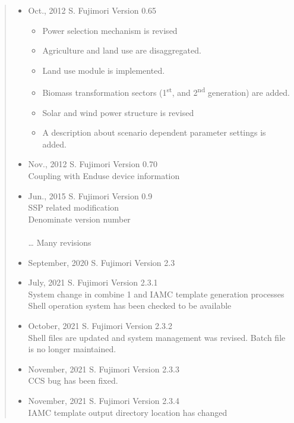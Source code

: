 \documentclass[10pt,a4paper,titlepage,dvipdfmx]{book}
\begin{document}
\begin{quote}
\begin{itemize}
  \item Oct., 2012 S. Fujimori Version 0.65
    \begin{itemize}
      \item Power selection mechanism is revised
      \item Agriculture and land use are disaggregated.
      \item Land use module is implemented.
      \item Biomass transformation sectors (1\textsuperscript{st}, and 2\textsuperscript{nd} generation) are added.
      \item Solar and wind power structure is revised
      \item A description about scenario dependent parameter settings is added. 
    \end{itemize}

  \item Nov., 2012 S. Fujimori Version 0.70 \mbox{}\\
      Coupling with Enduse device information

  \item Jun., 2015 S. Fujimori Version 0.9 \mbox{}\\
      SSP related modification\\
      Denominate version number\\
\\
{\ldots} Many revisions
\\
  \item September, 2020 S. Fujimori Version 2.3 \mbox{}\\

  \item July, 2021 S. Fujimori Version 2.3.1 \mbox{}\\
      System change in combine 1 and IAMC template generation processes
      Shell operation system has been checked to be available
      

  \item October, 2021 S. Fujimori Version 2.3.2 \mbox{}\\
     Shell files are updated and system management was revised. 
     Batch file is no longer maintained.


  \item November, 2021 S. Fujimori Version 2.3.3 \\
     CCS bug has been fixed.


  \item November, 2021 S. Fujimori Version 2.3.4 \\
     IAMC template output directory location has changed



\end{itemize}
\end{quote}
\end{document}
